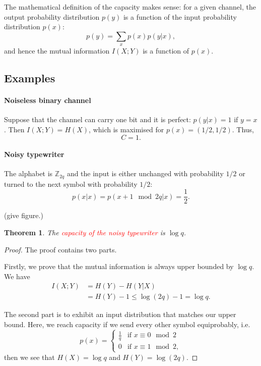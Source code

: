 \documentclass[a4paper, 11pt, openany]{book}
\numberwithin{equation}{section}
\theoremstyle{plain}
\newtheorem{theorem}	[equation]	{Theorem}
\theoremstyle{definition}
\newcommand{\Important}[1]{\textcolor{red}{#1}}
\begin{document}
The mathematical definition of the capacity makes sense: for a given channel, the output probability distribution $p(y)$ is a function of the input probability distribution $p(x)$:
\[
    p(y) = \sum_x p(x) p(y | x),
\]
and hence the mutual information $I(X;Y)$ is a function of $p(x)$.

\subsection{Examples}

\paragraph{Noiseless binary channel}
Suppose that the channel can carry one bit and it is perfect: $p(y|x) = 1$ if $y=x$. Then $I(X;Y) = H(X)$, which is maximised for $p(x) = (1/2, 1/2)$. 
Thus,
$$
	C = 1.
$$ 



\paragraph{Noisy typewriter}
The alphabet is $\mathbb{Z}_{2q}$ and the input is either unchanged with probability $1/2$ or turned to the next symbol with probability $1/2$:
$$
	p(x|x) = p(x+1 \mod 2q | x) = \frac{1}{2}.
$$

(give figure.)

\begin{theorem}
The \Important{capacity of the noisy typewriter} is $\log q$.
\end{theorem}

\begin{proof}
The proof contains two parts. 

Firstly, we prove that the mutual information is always upper bounded by $\log q$. We have
\begin{align*}
	I(X;Y) &= H(Y) - H(Y|X)\\
	&= H(Y) - 1 \le \log (2q) - 1 = \log q.
\end{align*}

The second part is to exhibit an input distribution that matches our upper bound. Here, we reach capacity if we send every other symbol equiprobably, i.e. 
\[
	p(x) = \begin{cases}
	\frac{1}{q} & \text{if } x \equiv 0 \mod 2\\
	0 & \text{if } x \equiv 1 \mod 2,
	\end{cases}
\]
then we see that $H(X) = \log q$ and $H(Y) = \log(2q)$.
\end{proof}
\end{document}
